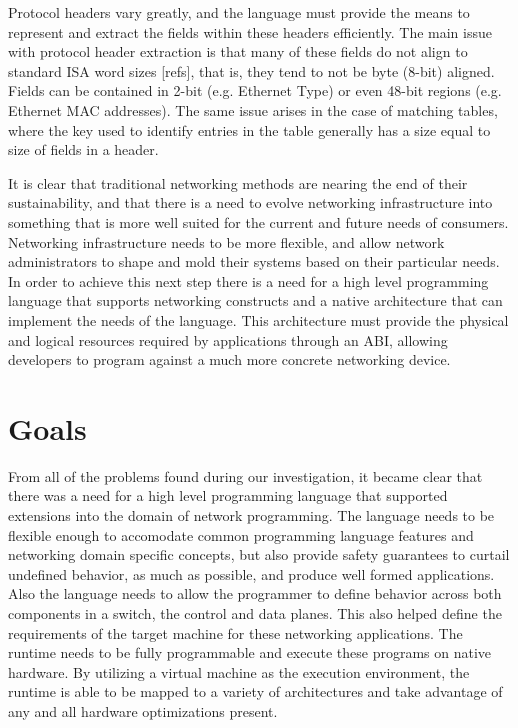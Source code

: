 Protocol headers vary greatly, and the language must provide the means to 
represent and extract the fields within these headers efficiently. The main 
issue with protocol header extraction is that many of these fields do not 
align to standard ISA word sizes [refs], that is, they tend to not be byte 
(8-bit) aligned. Fields can be contained in 2-bit (e.g. Ethernet Type) or even 
48-bit regions (e.g. Ethernet MAC addresses). The same issue arises in the case
of matching tables, where the key used to identify entries in the table 
generally has a size equal to size of fields in a header.

It is clear that traditional networking methods are nearing the end of their
sustainability, and that there is a need to evolve networking infrastructure
into something that is more well suited for the current and future needs of
consumers. Networking infrastructure needs to be more flexible, and allow 
network administrators to shape and mold their systems based on their
particular needs. In order to achieve this next step there is a need for a
high level programming language that supports networking constructs and
a native architecture that can implement the needs of the language. This
architecture must provide the physical and logical resources required by
applications through an ABI, allowing developers to program against a much
more concrete networking device.

\section{Goals}
From all of the problems found during our investigation, it became clear that
there was a need for a high level programming language that supported 
extensions into the domain of network programming. The language needs to be
flexible enough to accomodate common programming language features and 
networking domain specific concepts, but also provide safety guarantees to 
curtail undefined behavior, as much as possible, and produce well formed 
applications. Also the language needs to allow the programmer to define 
behavior across both components in a switch, the control and data planes. This 
also helped define the requirements of the target machine for these networking 
applications. The runtime needs to be fully programmable and execute these 
programs on native hardware. By utilizing a virtual machine as the execution 
environment, the runtime is able to be mapped to a variety of architectures 
and take advantage of any and all hardware optimizations present.

